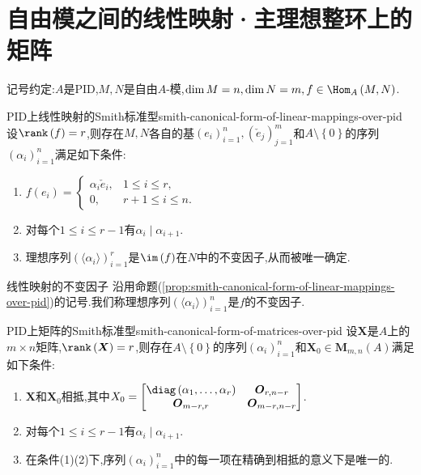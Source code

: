 \section{自由模之间的线性映射·主理想整环上的矩阵}

记号约定:$A$是PID,$M,N$是自由$A$-模,$\dim M=n,\dim N=m,f\in\Hom_{A}\left(M,N\right)$.

\begin{proposition}{PID上线性映射的Smith标准型}{smith-canonical-form-of-linear-mappings-over-pid}
	设$\rank\left(f\right)=r$,则存在$M,N$各自的基$\left(e_{i}\right)_{i=1}^{n},\left(\check{e}_{j}\right)_{j=1}^{m}$和$A\setminus\left\{0\right\}$的序列$\left(\alpha_{i}\right)_{i=1}^{n}$满足如下条件:
	\begin{enumerate}
		\item $f\left(e_{i}\right)=
		\begin{cases}
			\alpha_{i}\check{e}_{i},&1\leq i\leq r,\\
			0,&r+1\leq i\leq n.
		\end{cases}$
		\item 对每个$1\leq i\leq r-1$有$\alpha_{i}\mid\alpha_{i+1}$.
		\item 理想序列$\left(\langle\alpha_{i}\rangle\right)_{i=1}^{r}$是$\im\left(f\right)$在$N$中的不变因子,从而被唯一确定.
	\end{enumerate}
\end{proposition}

\begin{definition}{线性映射的不变因子}{}
	沿用命题(\ref{prop:smith-canonical-form-of-linear-mappings-over-pid})的记号.我们称理想序列$\left(\langle\alpha_{i}\rangle\right)_{i=1}^{n}$是$f$的不变因子.
\end{definition}

\begin{corollary}{PID上矩阵的Smith标准型}{smith-canonical-form-of-matrices-over-pid}
	设$\boldsymbol{X}$是$A$上的$m\times n$矩阵,$\rank\left(\boldsymbol{X}\right)=r$,则存在$A\setminus\left\{0\right\}$的序列$\left(\alpha_{i}\right)_{i=1}^{n}$和$\boldsymbol{X}_{0}\in\mathbf{M}_{m,n}\left(A\right)$满足如下条件:
	\begin{enumerate}
		\item $\boldsymbol{X}$和$\boldsymbol{X}_{0}$相抵,其中$X_{0}=\begin{bmatrix}
			\diag\left(\alpha_{1},\ldots,\alpha_{r}\right)&\boldsymbol{O}_{r,n-r}\\
			\boldsymbol{O}_{m-r,r}&\boldsymbol{O}_{m-r,n-r}
		\end{bmatrix}$.
		\item 对每个$1\leq i\leq r-1$有$\alpha_{i}\mid\alpha_{i+1}$.
		\item 在条件(1)(2)下,序列$\left(\alpha_{i}\right)_{i=1}^{n}$中的每一项在精确到相抵的意义下是唯一的.
	\end{enumerate}
\end{corollary}

